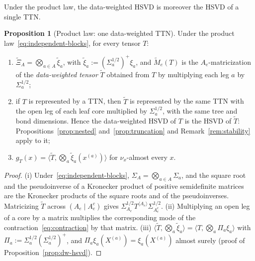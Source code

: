 \documentclass[11pt]{article}
\theoremstyle{definition}
\newtheorem{proposition}[theorem]{Proposition}
\numberwithin{equation}{section}
\begin{document}
Under the product law, the data-weighted HSVD is moreover the HSVD of a single TTN.

\begin{proposition}[Product law: one data-weighted TTN]\label{prop:dw-product}
Under the product law~\eqref{eq:independent-blocks}, for every tensor $T$:
\begin{enumerate}[label=(\roman*),nosep]
\item $\tilde\Xi_A=\bigotimes_{a\in A}\tilde\xi_a$, with $\tilde\xi_a:=(\Sigma_a^{1/2})^+\xi_a$, and $\tilde M_e(T)$ is the $A_e$-matricization of the \emph{data-weighted tensor} $\tilde T$ obtained from $T$ by multiplying each leg $a$ by $\Sigma_a^{1/2}$;
\item if $T$ is represented by a TTN, then $\tilde T$ is represented by the same TTN with the open leg of each leaf core multiplied by $\Sigma_a^{1/2}$, with the same tree and bond dimensions. Hence the data-weighted HSVD of $T$ is the HSVD of $\tilde T$: Propositions~\ref{prop:nested} and~\ref{prop:truncation} and Remark~\ref{rem:stability} apply to it;
\item $g_T(x)=\big\langle\tilde T,\bigotimes_a\tilde\xi_a(x^{(a)})\big\rangle$ for $\nu_x$-almost every $x$.
\end{enumerate}
\end{proposition}

\begin{proof}
(i) Under~\eqref{eq:independent-blocks}, $\Sigma_A=\bigotimes_{a\in A}\Sigma_a$, and the square root and the pseudoinverse of a Kronecker product of positive semidefinite matrices are the Kronecker products of the square roots and of the pseudoinverses. Matricizing $\tilde T$ across $(A_e\mid A_e^c)$ gives $\Sigma_{A_e}^{1/2}T^{\langle A_e\rangle}\Sigma_{A_e^c}^{1/2}$. (ii) Multiplying an open leg of a core by a matrix multiplies the corresponding mode of the contraction~\eqref{eq:contraction} by that matrix. (iii) $\langle\tilde T,\bigotimes_a\tilde\xi_a\rangle=\langle T,\bigotimes_a\Pi_a\xi_a\rangle$ with $\Pi_a:=\Sigma_a^{1/2}(\Sigma_a^{1/2})^+$, and $\Pi_a\xi_a(X^{(a)})=\xi_a(X^{(a)})$ almost surely (proof of Proposition~\ref{prop:dw-hsvd}).
\end{proof}
\end{document}
